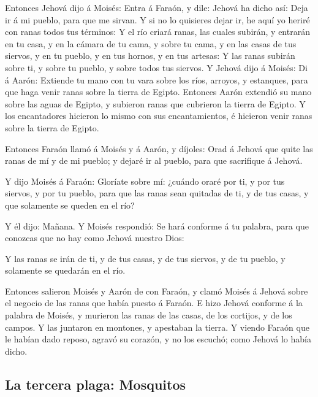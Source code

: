  Entonces Jehová dijo á Moisés: Entra á Faraón, y dile:
Jehová ha dicho así: Deja ir á mi pueblo, para que me sirvan.
 Y si no lo quisieres dejar ir, he aquí yo heriré con
ranas todos tus términos:  Y el río criará ranas, las
cuales subirán, y entrarán en tu casa, y en la cámara de tu cama, y
sobre tu cama, y en las casas de tus siervos, y en tu pueblo, y en tus
hornos, y en tus artesas:  Y las ranas subirán sobre ti, y
sobre tu pueblo, y sobre todos tus siervos.  Y Jehová dijo
á Moisés: Di á Aarón: Extiende tu mano con tu vara sobre los ríos,
arroyos, y estanques, para que haga venir ranas sobre la tierra de
Egipto.  Entonces Aarón extendió su mano sobre las aguas
de Egipto, y subieron ranas que cubrieron la tierra de Egipto.
 Y los encantadores hicieron lo mismo con sus
encantamientos, é hicieron venir ranas sobre la tierra de Egipto.

 Entonces Faraón llamó á Moisés y á Aarón, y díjoles: Orad
á Jehová que quite las ranas de mí y de mi pueblo; y dejaré ir al
pueblo, para que sacrifique á Jehová.

 Y dijo Moisés á Faraón: Gloríate sobre mí: ¿cuándo oraré
por ti, y por tus siervos, y por tu pueblo, para que las ranas sean
quitadas de ti, y de tus casas, y que solamente se queden en el río?

 Y él dijo: Mañana. Y Moisés respondió: Se hará conforme
á tu palabra, para que conozcas que no hay como Jehová nuestro Dios:

 Y las ranas se irán de ti, y de tus casas, y de tus
siervos, y de tu pueblo, y solamente se quedarán en el río.

 Entonces salieron Moisés y Aarón de con Faraón, y clamó
Moisés á Jehová sobre el negocio de las ranas que había puesto á Faraón.
 E hizo Jehová conforme á la palabra de Moisés, y
murieron las ranas de las casas, de los cortijos, y de los campos.
 Y las juntaron en montones, y apestaban la tierra.
 Y viendo Faraón que le habían dado reposo, agravó su
corazón, y no los escuchó; como Jehová lo había dicho.

\hypertarget{la-tercera-plaga-mosquitos}{%
\subsection{La tercera plaga:
Mosquitos}\label{la-tercera-plaga-mosquitos}}

